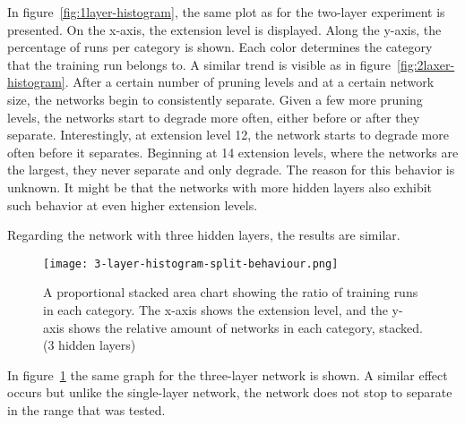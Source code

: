 In figure~\ref{fig:1layer-histogram}, the same plot as for the two-layer experiment is presented.
On the x-axis, the extension level is displayed. 
Along the y-axis, the percentage of runs per category is shown.
Each color determines the category that the training run belongs to.
A similar trend is visible as in figure~\ref{fig:2laxer-histogram}.
After a certain number of pruning levels and at a certain network size, the networks begin to consistently separate.
Given a few more pruning levels, the networks start to degrade more often, either before or after they separate.
Interestingly, at extension level 12, the network starts to degrade more often before it separates.
Beginning at 14 extension levels, where the networks are the largest, they never separate and only degrade.
The reason for this behavior is unknown.
It might be that the networks with more hidden layers also exhibit such behavior at even higher extension levels. 

Regarding the network with three hidden layers, the results are similar.
\begin{figure}[t] %
\centering
\texttt{[image: 3-layer-histogram-split-behaviour.png]}
\caption[Separation/Degradation Stacked Area Chart (3 hidden layers)]{
A proportional stacked area chart showing the ratio of training runs in each category.
The x-axis shows the extension level, and the y-axis shows the relative amount of networks in each category, stacked. (3 hidden layers)
}\label{fig:3layer-histogram}
\end{figure}
In figure~\ref{fig:3layer-histogram} the same graph for the three-layer network is shown.
A similar effect occurs but unlike the single-layer network, the network does not stop to separate in the range that was tested. 


